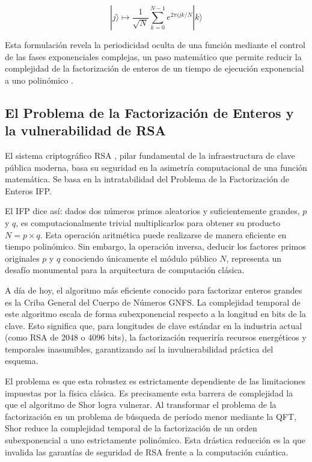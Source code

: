 \documentclass[11pt, a4paper]{report}
\theoremstyle{definition}
\begin{document}
$$|j\rangle \mapsto \frac{1}{\sqrt{N}} \sum_{k=0}^{N-1} e^{2\pi i j k / N} |k\rangle$$

Esta formulación revela la periodicidad oculta de una función mediante el control de las fases exponenciales complejas, un paso matemático que permite reducir la complejidad de la factorización de enteros de un tiempo de ejecución exponencial a uno polinómico \cite{nielsen2010}.

\subsection{El Problema de la Factorización de Enteros y la vulnerabilidad de RSA}

El sistema criptográfico RSA \cite{rivest1978}, pilar fundamental de la infraestructura de clave pública moderna, basa su seguridad en la asimetría computacional de una función matemática. Se basa en la intratabilidad del Problema de la Factorización de Enteros IFP.

El IFP dice así: dados dos números primos aleatorios y suficientemente grandes, $p$ y $q$, es computacionalmente trivial multiplicarlos para obtener su producto $N = p \times q$. Esta operación aritmética puede realizarse de manera eficiente en tiempo polinómico. Sin embargo, la operación inversa, deducir los factores primos originales $p$ y $q$ conociendo únicamente el módulo público $N$, representa un desafío monumental para la arquitectura de computación clásica.

A día de hoy, el algoritmo más eficiente conocido para factorizar enteros grandes es la Criba General del Cuerpo de Números GNFS. La complejidad temporal de este algoritmo escala de forma subexponencial respecto a la longitud en bits de la clave. Esto significa que, para longitudes de clave estándar en la industria actual (como RSA de 2048 o 4096 bits), la factorización requeriría recursos energéticos y temporales inasumibles, garantizando así la invulnerabilidad práctica del esquema.

El problema es que esta robustez es estrictamente dependiente de las limitaciones impuestas por la física clásica. Es precisamente esta barrera de complejidad la que el algoritmo de Shor logra vulnerar. Al transformar el problema de la factorización en un problema de búsqueda de período menor mediante la QFT, Shor reduce la complejidad temporal de la factorización de un orden subexponencial a uno estrictamente polinómico. Esta drástica reducción es la que invalida las garantías de seguridad de RSA frente a la computación cuántica.
\end{document}
